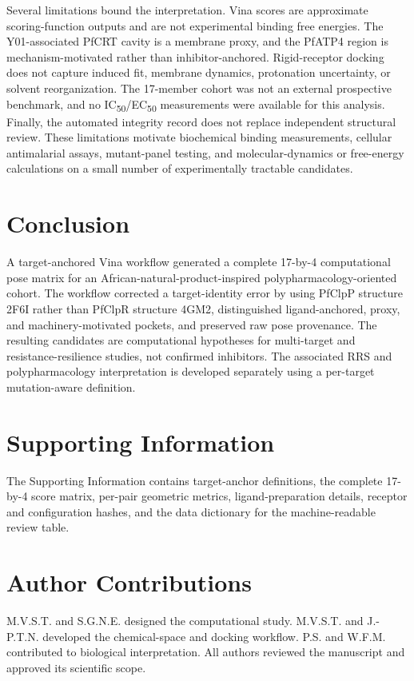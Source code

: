 \documentclass[journal=jcisd8,manuscript=article]{achemso}
\begin{document}
Several limitations bound the interpretation. Vina scores are approximate scoring-function outputs and are not experimental binding free energies. The Y01-associated PfCRT cavity is a membrane proxy, and the PfATP4 region is mechanism-motivated rather than inhibitor-anchored. Rigid-receptor docking does not capture induced fit, membrane dynamics, protonation uncertainty, or solvent reorganization. The 17-member cohort was not an external prospective benchmark, and no IC\textsubscript{50}/EC\textsubscript{50} measurements were available for this analysis. Finally, the automated integrity record does not replace independent structural review. These limitations motivate biochemical binding measurements, cellular antimalarial assays, mutant-panel testing, and molecular-dynamics or free-energy calculations on a small number of experimentally tractable candidates.

\section{Conclusion}
A target-anchored Vina workflow generated a complete 17-by-4 computational pose matrix for an African-natural-product-inspired polypharmacology-oriented cohort. The workflow corrected a target-identity error by using PfClpP structure 2F6I rather than PfClpR structure 4GM2, distinguished ligand-anchored, proxy, and machinery-motivated pockets, and preserved raw pose provenance. The resulting candidates are computational hypotheses for multi-target and resistance-resilience studies, not confirmed inhibitors. The associated RRS and polypharmacology interpretation is developed separately using a per-target mutation-aware definition.

\section*{Supporting Information}
The Supporting Information contains target-anchor definitions, the complete 17-by-4 score matrix, per-pair geometric metrics, ligand-preparation details, receptor and configuration hashes, and the data dictionary for the machine-readable review table.

\section*{Author Contributions}
M.V.S.T. and S.G.N.E. designed the computational study. M.V.S.T. and J.-P.T.N. developed the chemical-space and docking workflow. P.S. and W.F.M. contributed to biological interpretation. All authors reviewed the manuscript and approved its scientific scope.
\end{document}
